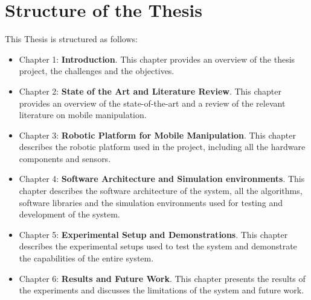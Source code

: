 \section*{Structure of the Thesis}

This Thesis is structured as follows:

\begin{itemize}
    \item Chapter 1: \textbf{Introduction}.
    This chapter provides an overview of the thesis project, the challenges and the objectives.
    \item Chapter 2: \textbf{State of the Art and Literature Review}. 
    This chapter provides an overview of the state-of-the-art and a review of the relevant literature on mobile manipulation.
    \item Chapter 3: \textbf{Robotic Platform for Mobile Manipulation}.
    This chapter describes the robotic platform used in the project, including all the hardware components and sensors.
    \item Chapter 4: \textbf{Software Architecture and Simulation environments}.
    This chapter describes the software architecture of the system, all the algorithms, software libraries and the simulation 
    environments used for testing and development of the system.
    \item Chapter 5: \textbf{Experimental Setup and Demonstrations}.
    This chapter describes the experimental setups used to test the system and demonstrate the capabilities of the entire system.
    \item Chapter 6: \textbf{Results and Future Work}.
    This chapter presents the results of the experiments and discusses the limitations of the system and future work.
\end{itemize}